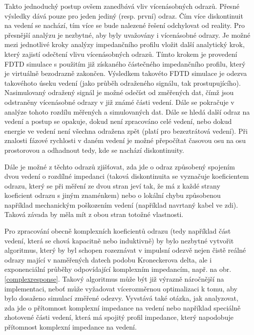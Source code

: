 Takto jednoduchý postup ovšem zanedbává vliv vícenásobných odrazů. Přesné výsledky dává pouze pro jeden jediný (resp. první) odraz. Čím více diskontinuit na vedení se nachází, tím více se bude nalezené řešení odchylovat od reality. Pro přesnější analýzu je nezbytné, aby byly uvažovány i vícenásobné odrazy. Je možné mezi jednotlivé kroky analýzy impedančního profilu vložit další analytický krok, který zajistí odečtení vlivu vícenásobných odrazů. Tímto krokem je provedení \acrshort{FDTD} simulace s použitím již získaného částečného impedančního profilu, který je virtuálně bezodrazně zakončen. Výsledkem takovéto \acrshort{FDTD} simulace je odezva takovéhoto úseku vedení (jako průběh odraženého signálu, tak prostupujícího). Nasimulovaný odražený signál je možné odečíst od změřených dat, čímž jsou odstraněny vícenásobné odrazy v již známé části vedení. Dále se pokračuje v analýze tohoto rozdílu měřených a simulovaných dat. Dále se hledá další odraz na vedení a postup se opakuje, dokud není zpracováno celé vedení, nebo dokud energie ve vedení není všechna odražena zpět (platí pro bezeztrátová vedení). Při znalosti fázové rychlosti v daném vedení je možné přepočítat časovou osu na osu prostorovou a odhadnout tedy, kde se nachází diskontinuity.

Dále je možné z těchto odrazů zjišťovat, zda jde o odraz způsobený spojením dvou vedení o rozdílné impedanci (taková diskontinuita se vyznačuje koeficientem odrazu, který se při měření ze dvou stran jeví tak, že má z každé strany koeficient odrazu s jiným znaménkem) nebo o lokální chybu způsobenou například mechanickým poškozením vedení (například navrtaný kabel ve zdi). Taková závada by měla mít z obou stran totožné vlastnosti.

Pro zpracování obecně komplexních koeficientů odrazu (tedy například část vedení, která se chová kapacitně nebo induktivně) by bylo nezbytné vytvořit algoritmus, který by byl schopen rozeznávat v impulsní odezvě nejen čistě reálné odrazy mající v naměřených datech podobu Kroneckerova delta, ale i exponenciální průběhy odpovídající komplexním impedancím, např. na obr. \ref{complexresponse}. Takový algoritmus může být již výrazně náročnější na implementaci, neboť může vyžadovat vícerozměrnou optimalizaci k tomu, aby bylo dosaženo simulací změřené odezvy. Vyvstává také otázka, jak analyzovat, zda jde o přítomnost komplexní impedance na vedení nebo například speciálně zhotovené části vedení, která má spojitý profil impedance, který napodobuje přítomnost komplexní impedance na vedení.

